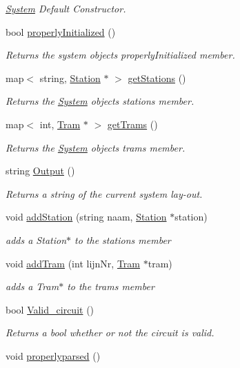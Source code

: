 \begin{DoxyCompactItemize}
\begin{DoxyCompactList}\small\item\em \hyperlink{classSystem}{System} Default Constructor. \end{DoxyCompactList}\item 
bool \hyperlink{classSystem_a8532240d722aafc7084ca6047909c8da}{properly\+Initialized} ()
\begin{DoxyCompactList}\small\item\em Returns the system object\textquotesingle{}s properly\+Initialized member. \end{DoxyCompactList}\item 
map$<$ string, \hyperlink{classStation}{Station} $\ast$ $>$ \hyperlink{classSystem_a30d05f13a13f95f580a0e705142fa3ea}{get\+Stations} ()
\begin{DoxyCompactList}\small\item\em Returns the \hyperlink{classSystem}{System} object\textquotesingle{}s stations member. \end{DoxyCompactList}\item 
map$<$ int, \hyperlink{classTram}{Tram} $\ast$ $>$ \hyperlink{classSystem_acec8555e085757a0fb8ebe9ba83a2142}{get\+Trams} ()
\begin{DoxyCompactList}\small\item\em Returns the \hyperlink{classSystem}{System} object\textquotesingle{}s trams member. \end{DoxyCompactList}\item 
string \hyperlink{classSystem_afd117849fbf4d7d8dc0f54988589c249}{Output} ()
\begin{DoxyCompactList}\small\item\em Returns a string of the current system lay-\/out. \end{DoxyCompactList}\item 
void \hyperlink{classSystem_a8d73a59e5ca0c23cc36d3bf4b7ac902d}{add\+Station} (string naam, \hyperlink{classStation}{Station} $\ast$station)
\begin{DoxyCompactList}\small\item\em adds a Station$\ast$ to the stations member \end{DoxyCompactList}\item 
void \hyperlink{classSystem_a9c6d16ae38e21499491a7059d67f9284}{add\+Tram} (int lijn\+Nr, \hyperlink{classTram}{Tram} $\ast$tram)
\begin{DoxyCompactList}\small\item\em adds a Tram$\ast$ to the trams member \end{DoxyCompactList}\item 
bool \hyperlink{classSystem_aca8e2da325015db5a6d1c5f908aa6d4b}{Valid\+\_\+circuit} ()
\begin{DoxyCompactList}\small\item\em Returns a bool whether or not the circuit is valid. \end{DoxyCompactList}\item 
void \hyperlink{classSystem_a8060d45e6030ee1ad01a11a990bdd1ad}{properlyparsed} ()\hypertarget{classSystem_a8060d45e6030ee1ad01a11a990bdd1ad}{}\label{classSystem_a8060d45e6030ee1ad01a11a990bdd1ad}


\end{DoxyCompactItemize}

